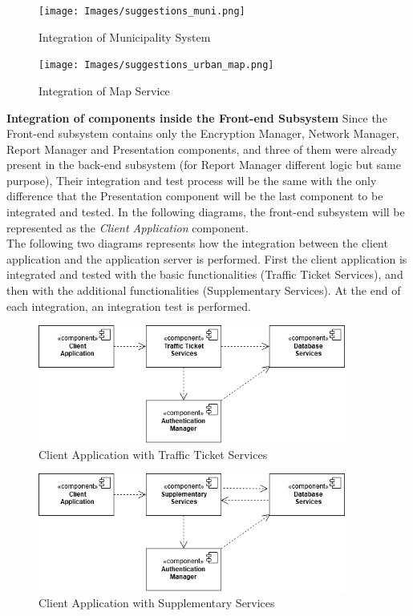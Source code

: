 \begin{figure}[H]
             \centering
          \texttt{[image: Images/suggestions\_muni.png]}
        \caption{Integration of Municipality System}
\end{figure}
\begin{figure}[H]
             \centering
          \texttt{[image: Images/suggestions\_urban\_map.png]}
        \caption{Integration of Map Service}
\end{figure}
\newpage
\noindent\textbf{Integration of components inside the Front-end Subsystem}\newline
Since the Front-end subsystem contains only the Encryption Manager, Network Manager, Report Manager and Presentation components, and three of them were already present in the back-end subsystem (for Report Manager different logic but same purpose), Their integration and test process will be the same with the only difference that the Presentation component will be the last component to be integrated and tested. In the following diagrams, the front-end subsystem will be represented as the \noindent\textit{Client Application} component.\newline \\
The following two diagrams represents how the integration between the client application and the application server is performed. First the client application is integrated and tested with the basic functionalities (Traffic Ticket Services), and then with the additional functionalities (Supplementary Services). At the end of each integration, an integration test is performed.
\begin{figure}[H]
             \centering
          \includegraphics[width=0.9\textwidth]{Images/client_tt_services.png}
        \caption{Client Application with Traffic Ticket Services}
        
    \end{figure}
         \begin{figure}[H]
             \centering
          \includegraphics[width=0.9\textwidth]{Images/client_supp_services.png}
        \caption{Client Application with Supplementary Services}
    \end{figure}
    
    